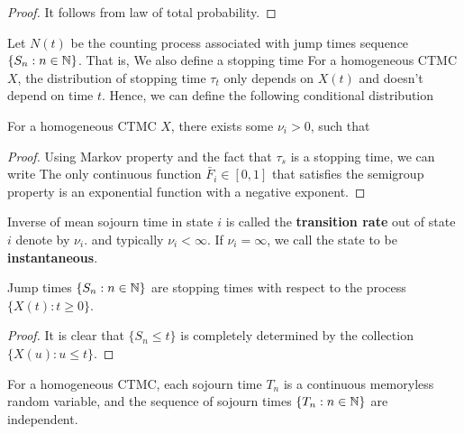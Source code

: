\documentclass[a4paper,10pt,english]{article}
\begin{document}
\begin{proof}
It follows from law of total probability. 
\end{proof}
Let $N(t)$ be the counting process associated with jump times sequence $\{S_n: n \in \mathbb{N}\}$. 
That is, 
We also define a stopping time 
For a homogeneous CTMC $X$, the distribution of stopping time $\tau_t$ only depends on $X(t)$ and doesn't depend on time $t$. 
Hence, we can define the following conditional distribution 
\begin{lem}
For a homogeneous CTMC $X$, there exists some $\nu_i > 0$, such that 
\end{lem}
\begin{proof}
Using Markov property and the fact that $\tau_s$ is a stopping time, we can write 
The only continuous function $\bar{F}_i \in [0,1]$ that satisfies the semigroup property is an exponential function with a negative exponent. 
\end{proof}
Inverse of mean sojourn time in state $i$ is called the \textbf{transition rate} out of state $i$ denote by $\nu_i$. and typically $\nu_i < \infty$.  
If $\nu_i = \infty$, we call the state to be \textbf{instantaneous}. 
\begin{lem} 
Jump times $\{S_n: n \in \mathbb{N}\}$ are stopping times with respect to the process $\{X(t): t \geqslant 0\}$. 
\end{lem}
\begin{proof}
It is clear that $\{S_n \leq t\}$ is completely determined by the collection $\{X(u): u \leqslant t\}$. 
\end{proof}
\begin{lem}
\label{Lemma:MemorylessSojourn}
For a homogeneous CTMC, each sojourn time $T_n$ is a continuous memoryless random variable, and the sequence of sojourn times $\{T_n: n \in \mathbb{N}\}$ are independent. %
\end{lem}
\end{document}
